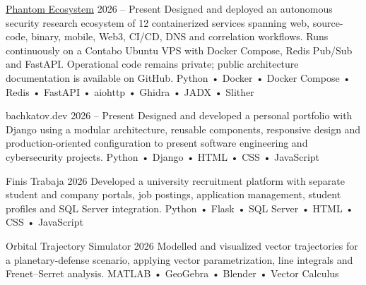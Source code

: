 
\ProjectEntry
{\href{https://github.com/Mskre87/Phantom_Ecosystem}{Phantom Ecosystem}}
{2026 -- Present}
{
Designed and deployed an autonomous security research ecosystem of 12 containerized services spanning web, source-code, binary, mobile, Web3, CI/CD, DNS and correlation workflows. Runs continuously on a Contabo Ubuntu VPS with Docker Compose, Redis Pub/Sub and FastAPI. Operational code remains private; public architecture documentation is available on GitHub.
}
{
Python • Docker • Docker Compose • Redis • FastAPI • aiohttp • Ghidra • JADX • Slither
}

\ProjectEntry
{bachkatov.dev}
{2026 -- Present}
{
Designed and developed a personal portfolio with Django using a modular architecture, reusable components, responsive design and production-oriented configuration to present software engineering and cybersecurity projects.
}
{
Python • Django • HTML • CSS • JavaScript
}

\ProjectEntry
{Finis Trabaja}
{2026}
{
Developed a university recruitment platform with separate student and company portals, job postings, application management, student profiles and SQL Server integration.
}
{
Python • Flask • SQL Server • HTML • CSS • JavaScript
}

\ProjectEntry
{Orbital Trajectory Simulator}
{2026}
{
Modelled and visualized vector trajectories for a planetary-defense scenario, applying vector parametrization, line integrals and Frenet--Serret analysis.
}
{
MATLAB • GeoGebra • Blender • Vector Calculus
}


